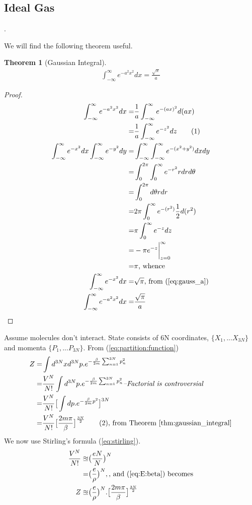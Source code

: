 \documentclass[]{article}
\newcommand\numberthis{\addtocounter{equation}{1}\tag{\theequation}}
\newtheorem{thm}{Theorem}
\begin{document}
\subsection{Ideal Gas}.

We will find the following theorem useful.

\begin{thm}[Gaussian Integral]\label{thm:gaussian_integral}
	\begin{align*}
		\int_{-\infty}^{\infty} e^{-a^2 x^2} dx = \frac{\sqrt{\pi}}{a}
	\end{align*}
\end{thm}

\begin{proof}
	\begin{align*}
		\int_{-\infty}^{\infty} e^{-a^2 x^2} dx =& \frac{1}{a} \int_{-\infty}^{\infty} e^{-(ax)^2} d(ax) \\
		=& \frac{1}{a} \int_{-\infty}^{\infty} e^{-z^2} dz \numberthis \label{eq:gauss_a}\\
		\int_{-\infty}^{\infty} e^{-x^2} dx \int_{-\infty}^{\infty} e^{-y^2} dy =& \int_{-\infty}^{\infty} \int_{-\infty}^{\infty} e^{-(x^2+y^2)}  dx dy\\
		=& \int_0^{2\pi} \int_{0}^{\infty}e^{-r^2} r dr d\theta\\
		=& \int_0^{2\pi}  d\theta  r dr\\
		=& 2\pi \int_{0}^{\infty}e^{-(r^2)} \frac{1}{2} d(r^2)\\
		=& \pi \int_{0}^{\infty} e^{-z} dz\\
		=& - \pi  e^{-z}\bigg\vert_{z=0}^{\infty}\\
		=& \pi\text{, whence}\\
		\int_{-\infty}^{\infty} e^{-x^2} dx =& \sqrt{\pi}\text{, from (\ref{eq:gauss_a})}\\
		\int_{-\infty}^{\infty} e^{-a^2 x^2} dx =& \frac{\sqrt{\pi}}{a}
	\end{align*}
\end{proof}

Assume molecules don't interact. State consists of 6N coordinates,  $\{X_1,...X_{3N}\}$ and momenta $\{P_1,...P_{3N}\}$. From (\ref{eq:partition:function})
\begin{align*}
Z =& \int d^{3N}x d^{3N}p . e^{- \frac{\beta}{2m} \sum_{n=1}^{3N} p_n^2}\\
=& \frac{V^N}{N!} \int d^{3N}p . e^{- \frac{\beta}{2m} \sum_{n=1}^{3N} p_n^2}\textit{--Factorial is controversial}\\
=& \frac{V^N}{N!} \big[\int dp. e^{-\frac{\beta}{2m}p^2}\big]^{3N}\\
=& \frac{V^N}{N!} \big[\frac{2 m \pi}{\beta}\big]^{\frac{3N}{2}}\numberthis\label{eq:Z_beta}\text{, from Theorem \ref{thm:gaussian_integral}}
\end{align*}
We now use Stirling's formula (\ref{eq:stirling}).
\begin{align*}
\frac{V^N}{N!} \approxeq& \big(\frac{eN}{N}\big)^N \\
=& \big(\frac{e}{\rho}\big)^N,\text{, and (\ref{eq:E:beta}) becomes}\\
Z \approxeq& \big(\frac{e}{\rho}\big)^N .  \big[\frac{2 m \pi}{\beta}\big]^{\frac{3N}{2}}
\end{align*}
\end{document}
